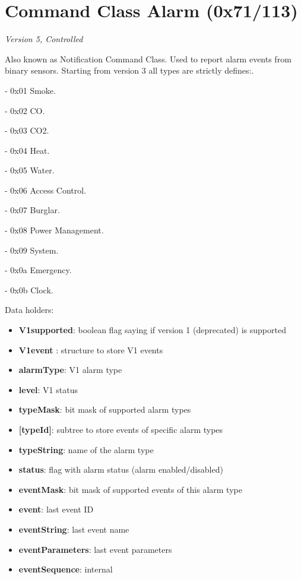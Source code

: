 \section{Command Class Alarm (0x71/113)}

\textit{Version 5, Controlled}
\newline

Also known as Notification Command Class. Used to report alarm events from binary sensors. Starting from version 3 all types are strictly defines:. 

- 0x01 Smoke. 

- 0x02 CO. 

- 0x03 CO2. 

- 0x04 Heat. 

- 0x05 Water. 

- 0x06 Access Control. 

- 0x07 Burglar. 

- 0x08 Power Management. 

- 0x09 System. 

- 0x0a Emergency. 

- 0x0b Clock.
\newline

\noindent
Data holders:

\begin{itemize}
\item \textbf{V1supported}: boolean flag saying if version 1 (deprecated) is supported
\item \textbf{V1event }: structure to store V1 events
\item \qquad\textbf{alarmType}: V1 alarm type
\item \qquad\textbf{level}: V1 status
\item \textbf{typeMask}: bit mask of supported alarm types
\item \textbf{[typeId]}: subtree to store events of specific alarm types
\item \qquad\textbf{typeString}: name of the alarm type
\item \qquad\textbf{status}: flag with alarm status (alarm enabled/disabled)
\item \qquad\textbf{eventMask}: bit mask of supported events of this alarm type
\item \qquad\textbf{event}: last event ID
\item \qquad\textbf{eventString}: last event name
\item \qquad\textbf{eventParameters}: last event parameters
\item \qquad\textbf{eventSequence}: internal
\end{itemize}

